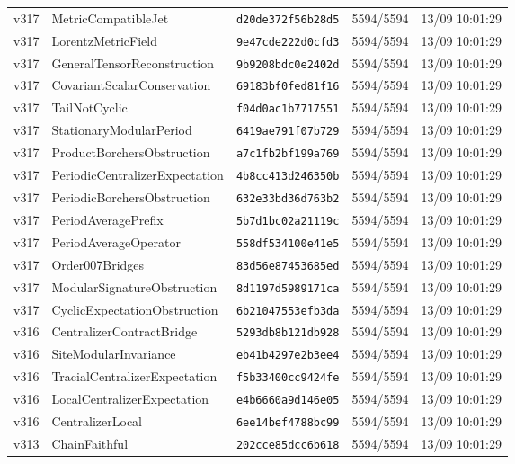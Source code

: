 \documentclass[11pt]{article}
\theoremstyle{definition}\newtheorem{deriv}{Derivação}
\begin{document}
{\begin{longtable}{@{}lllll@{}}
v317 & MetricCompatibleJet & \texttt{d20de372f56b28d5} & 5594/5594 & 13/09 10:01:29 \\
v317 & LorentzMetricField & \texttt{9e47cde222d0cfd3} & 5594/5594 & 13/09 10:01:29 \\
v317 & GeneralTensorReconstruction & \texttt{9b9208bdc0e2402d} & 5594/5594 & 13/09 10:01:29 \\
v317 & CovariantScalarConservation & \texttt{69183bf0fed81f16} & 5594/5594 & 13/09 10:01:29 \\
v317 & TailNotCyclic & \texttt{f04d0ac1b7717551} & 5594/5594 & 13/09 10:01:29 \\
v317 & StationaryModularPeriod & \texttt{6419ae791f07b729} & 5594/5594 & 13/09 10:01:29 \\
v317 & ProductBorchersObstruction & \texttt{a7c1fb2bf199a769} & 5594/5594 & 13/09 10:01:29 \\
v317 & PeriodicCentralizerExpectation & \texttt{4b8cc413d246350b} & 5594/5594 & 13/09 10:01:29 \\
v317 & PeriodicBorchersObstruction & \texttt{632e33bd36d763b2} & 5594/5594 & 13/09 10:01:29 \\
v317 & PeriodAveragePrefix & \texttt{5b7d1bc02a21119c} & 5594/5594 & 13/09 10:01:29 \\
v317 & PeriodAverageOperator & \texttt{558df534100e41e5} & 5594/5594 & 13/09 10:01:29 \\
v317 & Order007Bridges & \texttt{83d56e87453685ed} & 5594/5594 & 13/09 10:01:29 \\
v317 & ModularSignatureObstruction & \texttt{8d1197d5989171ca} & 5594/5594 & 13/09 10:01:29 \\
v317 & CyclicExpectationObstruction & \texttt{6b21047553efb3da} & 5594/5594 & 13/09 10:01:29 \\
v316 & CentralizerContractBridge & \texttt{5293db8b121db928} & 5594/5594 & 13/09 10:01:29 \\
v316 & SiteModularInvariance & \texttt{eb41b4297e2b3ee4} & 5594/5594 & 13/09 10:01:29 \\
v316 & TracialCentralizerExpectation & \texttt{f5b33400cc9424fe} & 5594/5594 & 13/09 10:01:29 \\
v316 & LocalCentralizerExpectation & \texttt{e4b6660a9d146e05} & 5594/5594 & 13/09 10:01:29 \\
v316 & CentralizerLocal & \texttt{6ee14bef4788bc99} & 5594/5594 & 13/09 10:01:29 \\
v313 & ChainFaithful & \texttt{202cce85dcc6b618} & 5594/5594 & 13/09 10:01:29 \\

\end{longtable}}
\end{document}
